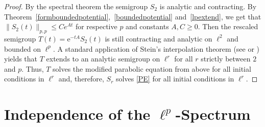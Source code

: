 \documentclass[10pt]{amsart}
\theoremstyle{definition}
\newtheorem*{remark}{Remark}
\newcommand{\eat}[1]{}
\begin{document}
\begin{proof}
By the spectral theorem the semigroup $S_2$ is analytic and contracting. By Theorem~\ref{formboundedpotential},~\ref{boundedpotential} and~\ref{lpextend}, we get that $\|S_2(t)\|_{p,p}\leq C e^{At}$ for respective $p$ and constants $A,C\ge 0.$ Then the rescaled semigroup $T(t) = \mathrm{e}^{-tA}S_2(t)$ is still contracting and analytic on $\ell^2$ and bounded on $\ell^p.$ A standard application of Stein's interpolation theorem (see \cite[Theorem~1 of Chaper III §2]{Stein} or \cite[Theorem~6.6]{Lunardi}) yields that $T$ extends to an analytic semigroup on $\ell^r$ for all $r$ strictly between $2$ and $p.$ Thus, $T$ solves the modified parabolic equation from above for all initial conditions in $\ell^r$ and, therefore, $S_r$ solves \eqref{PE} for all initial conditions in $\ell^r.$ 
\eat{Stein's interpolation theorem gives analyticity for contraction semigroups \cite[Theorem 1.4.2?]{Daviesbook} whenever $C\le 1$ and $A\le 0$. It is well known that this result can be extended to arbitrary constants  $C\ge 0,A\in\mathbb{R}$ by the discussion of \cite[Section~7?]{Ahrendt}. 
Now solvability of the parabolic equation follows as analytic semigroups map $\ell^p$ into the domain of their generator \cite[4.6 Theorem~(c)]{EngelNagel-oneparameter}. Note that in \cite{EngelNagel-oneparameter} states the result for uniformly bounded semigroups which can however be mitigated by normalizing $S_p$ via $T_p=e^{At}S_p$ cf.~\cite[Section~7?]{Ahrendt}.}
\end{proof}



\eat{
\begin{remark}
    We make no effort here to optimize the specific angle of analyticity of the respective semigroups. Since our arguments rely on Stein's interpolation theorem, one obtains the usual angle $\theta = \pi(1-1\slash p)$ for $1<p<2$ and duality yields angles for $2<p<\infty.$ However, it seems plausible that in the situation of Proposition \ref{analyticity} (a) one could adapt the result from \cite[Theorem 2.1]{LiSe} to obtain a potentially better angle that depends on the constants in the form bound for $c.$
\end{remark}}





\section{Independence of the $\ell^p$-Spectrum}
\label{s:p-independence}
\end{document}
